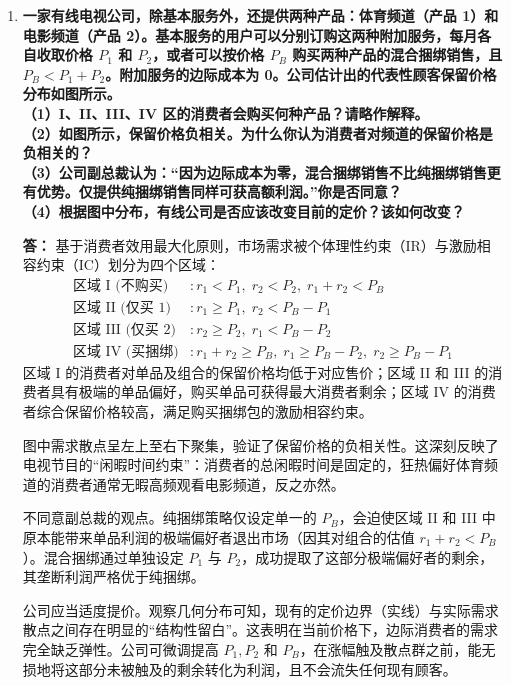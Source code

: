\begin{enumerate}[label=\textbf{\arabic*.}, leftmargin=*]
		\item \textbf{一家有线电视公司，除基本服务外，还提供两种产品：体育频道（产品 1）和电影频道（产品 2）。基本服务的用户可以分别订购这两种附加服务，每月各自收取价格 $P_1$ 和 $P_2$，或者可以按价格 $P_B$ 购买两种产品的混合捆绑销售，且 $P_B < P_1 + P_2$。附加服务的边际成本为 0。公司估计出的代表性顾客保留价格分布如图所示。\\
			（1）I、II、III、IV 区的消费者会购买何种产品？请略作解释。\\
			（2）如图所示，保留价格负相关。为什么你认为消费者对频道的保留价格是负相关的？\\
			（3）公司副总裁认为：“因为边际成本为零，混合捆绑销售不比纯捆绑销售更有优势。仅提供纯捆绑销售同样可获高额利润。”你是否同意？\\
			（4）根据图中分布，有线公司是否应该改变目前的定价？该如何改变？}
		
		\textbf{答：}
		基于消费者效用最大化原则，市场需求被个体理性约束（IR）与激励相容约束（IC）划分为四个区域：
		\[
		\begin{aligned}
			\text{区域 I (不购买)} &: r_1 < P_1, \; r_2 < P_2, \; r_1 + r_2 < P_B \\
			\text{区域 II (仅买 1)} &: r_1 \ge P_1, \; r_2 < P_B - P_1 \\
			\text{区域 III (仅买 2)} &: r_2 \ge P_2, \; r_1 < P_B - P_2 \\
			\text{区域 IV (买捆绑)} &: r_1 + r_2 \ge P_B, \; r_1 \ge P_B - P_2, \; r_2 \ge P_B - P_1
		\end{aligned}
		\]
		区域 I 的消费者对单品及组合的保留价格均低于对应售价；区域 II 和 III 的消费者具有极端的单品偏好，购买单品可获得最大消费者剩余；区域 IV 的消费者综合保留价格较高，满足购买捆绑包的激励相容约束。
		
		图中需求散点呈左上至右下聚集，验证了保留价格的负相关性。这深刻反映了电视节目的“闲暇时间约束”：消费者的总闲暇时间是固定的，狂热偏好体育频道的消费者通常无暇高频观看电影频道，反之亦然。
		
		不同意副总裁的观点。纯捆绑策略仅设定单一的 $P_B$，会迫使区域 II 和 III 中原本能带来单品利润的极端偏好者退出市场（因其对组合的估值 $r_1+r_2 < P_B$）。混合捆绑通过单独设定 $P_1$ 与 $P_2$，成功提取了这部分极端偏好者的剩余，其垄断利润严格优于纯捆绑。
		
		公司应当适度提价。观察几何分布可知，现有的定价边界（实线）与实际需求散点之间存在明显的“结构性留白”。这表明在当前价格下，边际消费者的需求完全缺乏弹性。公司可微调提高 $P_1, P_2$ 和 $P_B$，在涨幅触及散点群之前，能无损地将这部分未被触及的剩余转化为利润，且不会流失任何现有顾客。
		

\end{enumerate}
